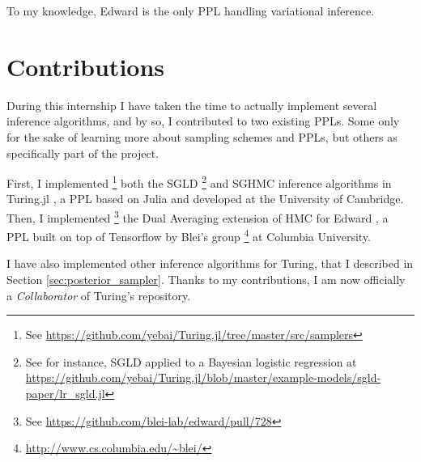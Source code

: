 To my knowledge, Edward \cite{Edward} is the only \gls{PPL} handling variational inference.

\section{Contributions}
During this internship I have taken the time to actually implement several inference algorithms, and by so, I contributed to two existing \glspl{PPL}.
Some only for the sake of learning more about sampling schemes and \glspl{PPL}, but others as specifically part of the project. 

First, I implemented \footnote{See \url{https://github.com/yebai/Turing.jl/tree/master/src/samplers}} both the \gls{SGLD} \footnote{See for instance, \gls{SGLD} applied to a Bayesian logistic regression at \url{https://github.com/yebai/Turing.jl/blob/master/example-models/sgld-paper/lr_sgld.jl}} and \gls{SGHMC} inference algorithms in Turing.jl \cite{Turing}, a \gls{PPL} based on Julia \cite{Bezanson:2017gd} and developed at the University of Cambridge.
Then, I implemented \footnote{See \url{https://github.com/blei-lab/edward/pull/728}} the Dual Averaging extension \cite{NUTS} of \gls{HMC} for Edward \cite{Edward}, a \gls{PPL} built on top of Tensorflow \cite{Tensorflow} by Blei's group \footnote{\url{http://www.cs.columbia.edu/~blei/}} at Columbia University.

I have also implemented other inference algorithms for Turing, that I described in Section \ref{sec:posterior_sampler}. Thanks to my contributions, I am now officially a \textit{Collaborator} of Turing's repository.


